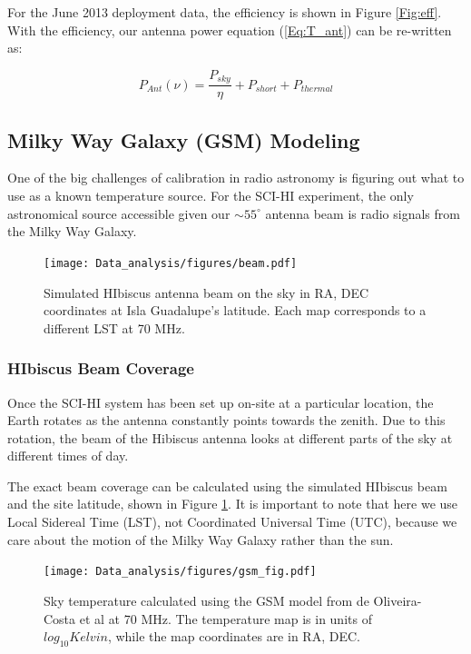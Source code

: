 For the June 2013 deployment data, the efficiency is shown in Figure \ref{Fig:eff}. With the efficiency, our antenna power equation (\ref{Eq:T_ant}) can be re-written as:

\begin{equation}
P_{Ant}(\nu) = \frac{P_{sky}}{\eta} + P_{short} +P_{thermal}
\end{equation}

\subsection{Milky Way Galaxy (GSM) Modeling} \label{Sec:model}

One of the big challenges of calibration in radio astronomy is figuring out what to use as a known temperature source. For the SCI-HI experiment, the only astronomical source accessible given our $\sim 55 ^\circ$ antenna beam is radio signals from the Milky Way Galaxy. 

\begin{figure}[htb]
\begin{center}
\texttt{[image: Data\_analysis/figures/beam.pdf]}
\caption{Simulated HIbiscus antenna beam on the sky in RA, DEC coordinates at Isla Guadalupe's latitude. Each map corresponds to a different LST at 70 MHz. }
\label{Fig:HIbiscus_beam}
\end{center}
\end{figure}

\subsubsection{HIbiscus Beam Coverage}

Once the SCI-HI system has been set up on-site at a particular location, the Earth rotates as the antenna constantly points towards the zenith. Due to this rotation, the beam of the Hibiscus antenna looks at different parts of the sky at different times of day. 

The exact beam coverage can be calculated using the simulated HIbiscus beam and the site latitude, shown in Figure \ref{Fig:HIbiscus_beam}.  It is important to note that here we use Local Sidereal Time (LST), not Coordinated Universal Time (UTC), because we care about the motion of the Milky Way Galaxy rather than the sun.  

\begin{figure}[htb]
\begin{center}
\texttt{[image: Data\_analysis/figures/gsm\_fig.pdf]}
\caption{Sky temperature calculated using the GSM model from de Oliveira-Costa et al \cite{GSM_model} at 70 MHz. The temperature map is in units of $log_{10} Kelvin$, while the map coordinates are in RA, DEC. }
\label{Fig:GSM_model}
\end{center}
\end{figure}

